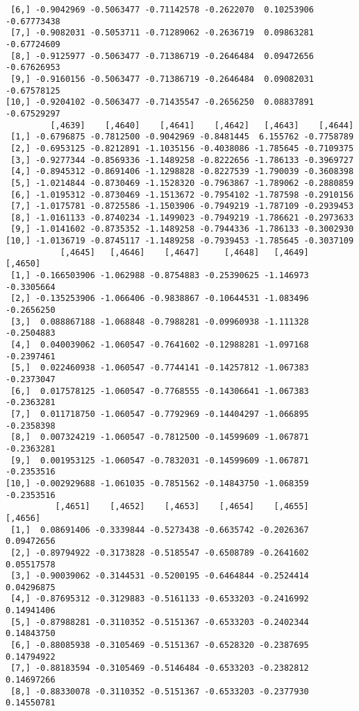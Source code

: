 \documentclass[
  letterpaper,
  DIV=11,
  numbers=noendperiod]{scrreprt}
\begin{document}
\begin{verbatim}
 [6,] -0.9042969 -0.5063477 -0.71142578 -0.2622070  0.10253906 -0.67773438
 [7,] -0.9082031 -0.5053711 -0.71289062 -0.2636719  0.09863281 -0.67724609
 [8,] -0.9125977 -0.5063477 -0.71386719 -0.2646484  0.09472656 -0.67626953
 [9,] -0.9160156 -0.5063477 -0.71386719 -0.2646484  0.09082031 -0.67578125
[10,] -0.9204102 -0.5063477 -0.71435547 -0.2656250  0.08837891 -0.67529297
         [,4639]    [,4640]    [,4641]    [,4642]   [,4643]    [,4644]
 [1,] -0.6796875 -0.7812500 -0.9042969 -0.8481445  6.155762 -0.7758789
 [2,] -0.6953125 -0.8212891 -1.1035156 -0.4038086 -1.785645 -0.7109375
 [3,] -0.9277344 -0.8569336 -1.1489258 -0.8222656 -1.786133 -0.3969727
 [4,] -0.8945312 -0.8691406 -1.1298828 -0.8227539 -1.790039 -0.3608398
 [5,] -1.0214844 -0.8730469 -1.1528320 -0.7963867 -1.789062 -0.2880859
 [6,] -1.0195312 -0.8730469 -1.1513672 -0.7954102 -1.787598 -0.2910156
 [7,] -1.0175781 -0.8725586 -1.1503906 -0.7949219 -1.787109 -0.2939453
 [8,] -1.0161133 -0.8740234 -1.1499023 -0.7949219 -1.786621 -0.2973633
 [9,] -1.0141602 -0.8735352 -1.1489258 -0.7944336 -1.786133 -0.3002930
[10,] -1.0136719 -0.8745117 -1.1489258 -0.7939453 -1.785645 -0.3037109
           [,4645]   [,4646]    [,4647]     [,4648]   [,4649]    [,4650]
 [1,] -0.166503906 -1.062988 -0.8754883 -0.25390625 -1.146973 -0.3305664
 [2,] -0.135253906 -1.066406 -0.9838867 -0.10644531 -1.083496 -0.2656250
 [3,]  0.088867188 -1.068848 -0.7988281 -0.09960938 -1.111328 -0.2504883
 [4,]  0.040039062 -1.060547 -0.7641602 -0.12988281 -1.097168 -0.2397461
 [5,]  0.022460938 -1.060547 -0.7744141 -0.14257812 -1.067383 -0.2373047
 [6,]  0.017578125 -1.060547 -0.7768555 -0.14306641 -1.067383 -0.2363281
 [7,]  0.011718750 -1.060547 -0.7792969 -0.14404297 -1.066895 -0.2358398
 [8,]  0.007324219 -1.060547 -0.7812500 -0.14599609 -1.067871 -0.2363281
 [9,]  0.001953125 -1.060547 -0.7832031 -0.14599609 -1.067871 -0.2353516
[10,] -0.002929688 -1.061035 -0.7851562 -0.14843750 -1.068359 -0.2353516
          [,4651]    [,4652]    [,4653]    [,4654]    [,4655]    [,4656]
 [1,]  0.08691406 -0.3339844 -0.5273438 -0.6635742 -0.2026367 0.09472656
 [2,] -0.89794922 -0.3173828 -0.5185547 -0.6508789 -0.2641602 0.05517578
 [3,] -0.90039062 -0.3144531 -0.5200195 -0.6464844 -0.2524414 0.04296875
 [4,] -0.87695312 -0.3129883 -0.5161133 -0.6533203 -0.2416992 0.14941406
 [5,] -0.87988281 -0.3110352 -0.5151367 -0.6533203 -0.2402344 0.14843750
 [6,] -0.88085938 -0.3105469 -0.5151367 -0.6528320 -0.2387695 0.14794922
 [7,] -0.88183594 -0.3105469 -0.5146484 -0.6533203 -0.2382812 0.14697266
 [8,] -0.88330078 -0.3110352 -0.5151367 -0.6533203 -0.2377930 0.14550781

\end{verbatim}
\end{document}

